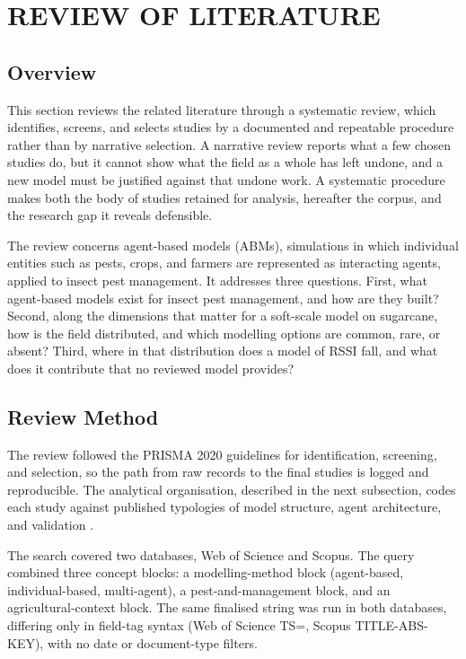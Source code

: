 \section{REVIEW OF LITERATURE}

\subsection{Overview}

This section reviews the related literature through a systematic review, which identifies, screens, and selects studies by a documented and repeatable procedure rather than by narrative selection. A narrative review reports what a few chosen studies do, but it cannot show what the field as a whole has left undone, and a new model must be justified against that undone work. A systematic procedure makes both the body of studies retained for analysis, hereafter the corpus, and the research gap it reveals defensible.

The review concerns agent-based models (ABMs), simulations in which individual entities such as pests, crops, and farmers are represented as interacting agents, applied to insect pest management. It addresses three questions. First, what agent-based models exist for insect pest management, and how are they built? Second, along the dimensions that matter for a soft-scale model on sugarcane, how is the field distributed, and which modelling options are common, rare, or absent? Third, where in that distribution does a model of RSSI fall, and what does it contribute that no reviewed model provides?

\subsection{Review Method}

The review followed the PRISMA 2020 guidelines \citep{Page2021} for identification, screening, and selection, so the path from raw records to the final studies is logged and reproducible. The analytical organisation, described in the next subsection, codes each study against published typologies of model structure, agent architecture, and validation \citep{Taillandier2019,Wooldridge1995,Rykiel1996}.

The search covered two databases, Web of Science and Scopus. The query combined three concept blocks: a modelling-method block (agent-based, individual-based, multi-agent), a pest-and-management block, and an agricultural-context block. The same finalised string was run in both databases, differing only in field-tag syntax (Web of Science TS=, Scopus TITLE-ABS-KEY), with no date or document-type filters.


